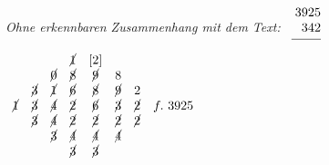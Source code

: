 \pend
\vspace*{4.0em}%
\pstart%
\noindent%
\textit{Ohne erkennbaren Zusammenhang mit dem Text:}
\pend
\vspace*{1.5em}%
\pstart%
$\begin{array}{rr} 3925 \\ 342 \\ \rule[2mm]{8mm}{0.4pt} \end{array}$ \hspace{2em}
$\begin{array}{cccccccc}
&&&\cancel{1}&[2]&&&\\
&&\cancel{0}&\cancel{8}&\cancel{9}&8&&\\
&\cancel{3}&\cancel{1}&\cancel{6}&\cancel{8}&\cancel{9}&2&\\
\cancel{1}&\cancel{3}&\cancel{4}&\cancel{2}&\cancel{6}&\cancel{3}&\cancel{2}& f.\ 3925\\
&\cancel{3}&\cancel{4}&\cancel{2}&\cancel{2}&\cancel{2}&\cancel{2}&\\
&&\cancel{3}&\cancel{4}&\cancel{4}&\cancel{4}&&\\
&&&\cancel{3}&\cancel{3}&&&\\
\end{array}$ %
\pend
\count{}
\count{}
\count{}
